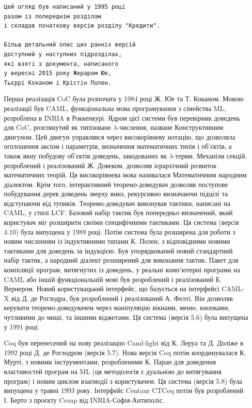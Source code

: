 \documentclass{article}
\begin{document}
\begin{verbatim}
Цей огляд був написаний у 1995 році
разом із попереднім розділом
і складав початкову версію розділу "Кредити".

Більш детальний опис цих ранніх версій
доступний у наступних підрозділах,
які взяті з документа, написаного
у вересні 2015 року Жераром Юе,
Тьєррі Коканом і Крістін Полен.
\end{verbatim}

Перша реалізація CoC була розпочата у 1984 році Ж. Юе та Т. Коканом. Мовою реалізації був CAML, функціональна мова програмування з сімейства ML, розроблена в INRIA в Роккенкурі. Ядром цієї системи був перевірник доведень для CoC, розглянутий як типізоване $\lambda$-числення, назване Конструктивним двигуном. Цей двигун управлявся через високорівневу нотацію, що дозволяла оголошення аксіом і параметрів, визначення математичних типів і об’єктів, а також явну побудову об’єктів доведень, закодованих як $\lambda$-терми. Механізм секцій, розроблений і реалізований Ж. Довеком, дозволяв ієрархічний розвиток математичних теорій. Ця високорівнева мова називалася Математичним народним діалектом. Крім того, інтерактивний теоремо-доведувач дозволяв поступове побудування дерев доведень зверху вниз, рекурсивно визначаючи підцілі та відступаючи від тупиків. Теоремо-доведувач виконував тактики, написані на CAML, у стилі LCF. Базовий набір тактик був попередньо визначений, який користувач міг розширити своїми специфічними тактиками. Ця система (версія 4.10) була випущена у 1989 році. Потім система була розширена для роботи з новим численням із індуктивними типами К. Полен, з відповідними новими тактиками для доведень за індукцією. Був упорядкований новий стандартний набір тактик, а народний діалект розширений для виконання тактик. Пакет для компіляції програм, витягнутих із доведень, у реальні комп’ютерні програми на CAML або іншій функціональній мові був розроблений і реалізований Б. Вернером. Новий користувацький інтерфейс, що базується на інтерфейсі CAML-X від Д. де Роглодра, був розроблений і реалізований А. Фелті. Він дозволяв керувати теоремо-доведувачем через маніпуляцію вікнами, меню, кнопками, чутливими до миші, та іншими віджетами. Ця система (версія 5.6) була випущена у 1991 році.

Coq був перенесений на нову реалізацію Caml-light від К. Леруа та Д. Доліже в 1992 році Д. де Роглодром (версія 5.7). Нова версія Coq потім координувалася К. Мурті, з новими інструментами, розробленими К. Паран для доведення властивостей програм на ML (ця методологія є дуальною до витягування програм) і новим циклом взаємодії з користувачем. Ця система (версія 5.8) була випущена у травні 1993 року. Інтерфейс Centaur CTCoq потім був розроблений І. Берто з проєкту Croap від INRIA-Софія-Антиполіс.
\end{document}
